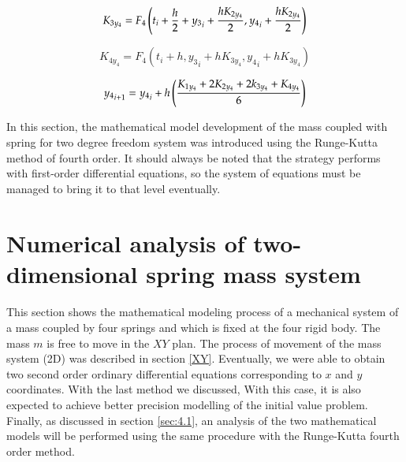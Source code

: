 \begin{equation}
    {K_{3y_4}} = F_4\left( {{t_i}+\frac{h}{2} + {y_3}_i+{h K_{2y_4} \over 2},{y_4}_i + {h K_{2y_4} \over 2}} \right)
\end{equation}

\begin{equation}
    {K_{4y_4}} = F_4\left( {{t_i}+h, {y_3}_i+{h K_{3y_4}},{y_4}_i + {h K_{3y_4}}} \right)
\end{equation}

\begin{equation}
    {y_4}_{i+1} = {y_4}_i +h \left( K_{1y_4}+ 2K_{2y_4} + 2k_{3y_4} +K_{4y_4}  \over 6 \right)
\end{equation}

In this section, the mathematical model development of the mass coupled with spring for two degree freedom system was introduced using the Runge-Kutta method of fourth order. It should always be noted that the strategy performs with first-order differential equations, so the system of equations must be managed to bring it to that level eventually. 

\section{Numerical analysis of two-dimensional spring mass system}
\paragraph{}

 This section shows the mathematical modeling process of a mechanical system of a mass coupled by four springs and which is fixed at the four rigid body. The mass $m$ is free to move in the $XY$ plan. The process of movement of the mass system (2D) was described in section \ref{XY}. Eventually, we were able to obtain two second order ordinary differential equations corresponding to $x$ and $y$ coordinates. With the last method we discussed, With this case, it is also expected to achieve better precision modelling of the initial value problem. Finally, as discussed in section \ref{sec:4.1}, an analysis of the two mathematical models will be performed using the same procedure with the Runge-Kutta fourth order method.
